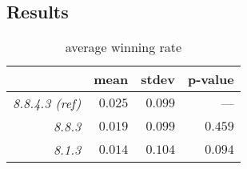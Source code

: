 \subsection{Results} 

\begin{table}
\caption{average winning rate}
\begin{center}
\begin{tabular}{|r|r|r|r|}
\hline
       &       {\bf mean }&    {\bf stdev} &  {\bf p-value} \\
\hline
	\emph{8.8.4.3 (ref)} & $  0.025$ &  $ 0.099 $ &        --- \\
\hline
	\emph{ 8.8.3 }&   $0.019$ &  $  0.099 $ & $ 0.459 $ \\
\hline
 	\emph{8.1.3 }&  $ 0.014$ &   $ 0.104 $ & $ 0.094 $ \\
\hline
\end{tabular}  
\label{table:winningRate}
\end{center}
\end{table}

